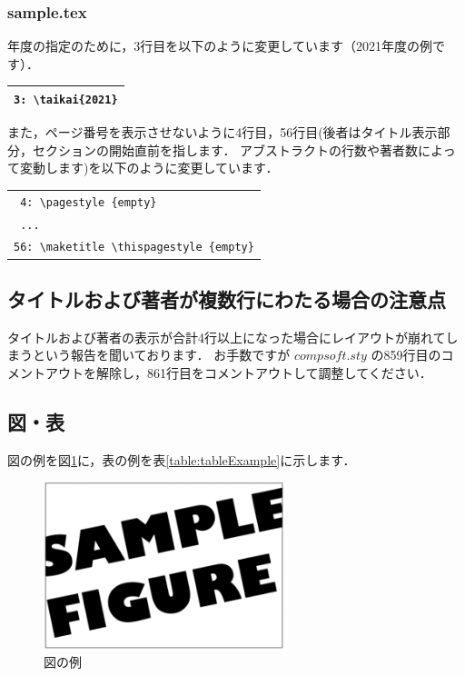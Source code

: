 \documentclass[T]{compsoft}
\begin{document}
\subsubsection*{sample.tex}
年度の指定のために，3行目を以下のように変更しています（2021年度の例です）．

\begin{tabularx}{23zw}{|X|}
	\hline
	\verb|3: \taikai{2021}|
	\\
	\hline
\end{tabularx}

また，ページ番号を表示させないように4行目，56行目(後者はタイトル表示部分，セクションの開始直前を指します．
アブストラクトの行数や著者数によって変動します)を以下のように変更しています．\\

\begin{tabularx}{23zw}{|X|}
	\hline
	\verb| 4: \pagestyle {empty}| ~\\
	\verb| ... | ~\\
	\verb|56: \maketitle \thispagestyle {empty}|
	\\
	\hline
\end{tabularx}

\subsection{タイトルおよび著者が複数行にわたる場合の注意点}
タイトルおよび著者の表示が合計4行以上になった場合にレイアウトが崩れてしまうという報告を聞いております．
お手数ですが $compsoft.sty$ の859行目のコメントアウトを解除し，861行目をコメントアウトして調整してください．

\subsection{図・表}

図の例を図\ref{fig:figExample}に，表の例を表\ref{table:tableExample}に示します．

\begin{figure}[tb]
	\includegraphics[width=7.0cm]{image/sampleFig.png}
	\caption{図の例}
	\label{fig:figExample}
\end{figure}
\end{document}
